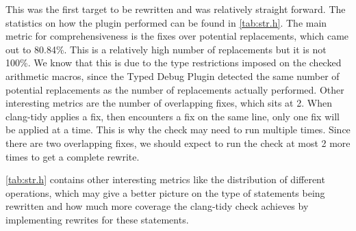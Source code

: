This was the first target to be rewritten and was relatively straight forward. The statistics on how the plugin performed can be found in \ref{tab:str.h}. The main metric for comprehensiveness is the fixes over potential replacements, which came out to 80.84\%. This is a relatively high number of replacements but it is not 100\%. We know that this is due to the type restrictions imposed on the checked arithmetic macros, since the Typed Debug Plugin detected the same number of potential replacements as the number of replacements actually performed. Other interesting metrics are the number of overlapping fixes, which sits at 2. When clang-tidy applies a fix, then encounters a fix on the same line, only one fix will be applied at a time. This is why the check may need to run multiple times. Since there are two overlapping fixes, we should expect to run the check at most 2 more times to get a complete rewrite.

\ref{tab:str.h} contains other interesting metrics like the distribution of different operations, which may give a better picture on the type of statements being rewritten and how much more coverage the clang-tidy check achieves by implementing rewrites for these statements.

